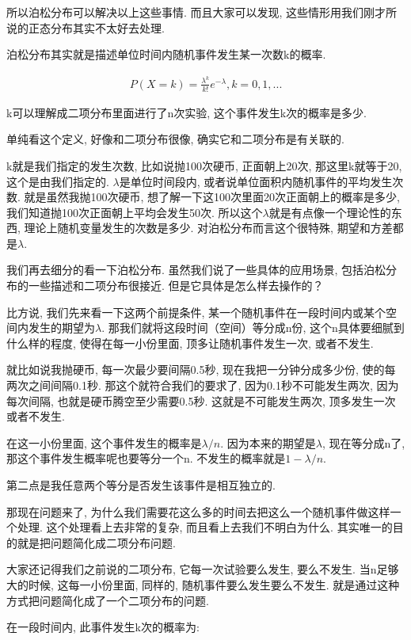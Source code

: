 所以泊松分布可以解决以上这些事情. 而且大家可以发现, 这些情形用我们刚才所说的正态分布其实不太好去处理. 

泊松分布其实就是描述单位时间内随机事件发生某一次数k的概率. 

\begin{align*}
  P(X=k) = \frac{\lambda^k}{k!}e^{-\lambda},k=0,1,...
\end{align*}

k可以理解成二项分布里面进行了n次实验, 这个事件发生k次的概率是多少. 

单纯看这个定义, 好像和二项分布很像, 确实它和二项分布是有关联的. 

k就是我们指定的发生次数, 比如说抛100次硬币, 正面朝上20次, 那这里k就等于20, 这个是由我们指定的. $\lambda$是单位时间段内, 或者说单位面积内随机事件的平均发生次数. 就是虽然我抛100次硬币, 想了解一下这100次里面20次正面朝上的概率是多少, 我们知道抛100次正面朝上平均会发生50次. 所以这个$\lambda$就是有点像一个理论性的东西, 理论上随机变量发生的次数是多少. 对泊松分布而言这个很特殊, 期望和方差都是$\lambda$. 

我们再去细分的看一下泊松分布. 虽然我们说了一些具体的应用场景, 包括泊松分布的一些描述和二项分布很接近. 但是它具体是怎么样去操作的？

比方说, 我们先来看一下这两个前提条件, 某一个随机事件在一段时间内或某个空间内发生的期望为$\lambda$. 那我们就将这段时间（空间）等分成n份, 这个n具体要细腻到什么样的程度, 使得在每一小份里面, 顶多让随机事件发生一次, 或者不发生. 

就比如说我抛硬币, 每一次最少要间隔0.5秒, 现在我把一分钟分成多少份, 使的每两次之间间隔0.1秒. 那这个就符合我们的要求了, 因为0.1秒不可能发生两次, 因为每次间隔, 也就是硬币腾空至少需要0.5秒. 这就是不可能发生两次, 顶多发生一次或者不发生. 

在这一小份里面, 这个事件发生的概率是$\lambda /n$. 因为本来的期望是$\lambda$, 现在等分成n了, 那这个事件发生概率呢也要等分一个n. 不发生的概率就是$1-\lambda /n$. 

第二点是我任意两个等分是否发生该事件是相互独立的. 

那现在问题来了, 为什么我们需要花这么多的时间去把这么一个随机事件做这样一个处理. 这个处理看上去非常的复杂, 而且看上去我们不明白为什么. 其实唯一的目的就是把问题简化成二项分布问题. 

大家还记得我们之前说的二项分布, 它每一次试验要么发生, 要么不发生. 当n足够大的时候, 这每一小份里面, 同样的, 随机事件要么发生要么不发生. 就是通过这种方式把问题简化成了一个二项分布的问题. 

在一段时间内, 此事件发生k次的概率为: 

